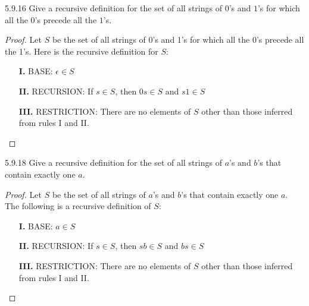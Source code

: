 \begin{question}
    {5.9.16}
    {
        Give a recursive definition for the set of all strings of $0$'s and $1$'s for which all the $0$'s precede all the $1$'s.
    }
\end{question}
\begin{proof}
    Let $S$ be the set of all strings of 0's and 1's for which all the 0's precede all the 1's. Here is the recursive definition for $S$:
    \begin{enumerate}
        \item[\textbf{I.}] BASE: $\epsilon \in S$
        \item[\textbf{II.}] RECURSION: If $s \in S$, then $0s \in S$ and $s1 \in S$
        \item[\textbf{III.}] RESTRICTION: There are no elements of $S$ other than those inferred from rules I and II.
    \end{enumerate}
    \vspace{-\baselineskip}
\end{proof}

\begin{question}
    {5.9.18}
    {
        Give a recursive definition for the set of all strings of $a$'s and $b$'s that contain exactly one $a$.
    }
\end{question}
\begin{proof}
    Let $S$ be the set of all strings of $a$'s and $b$'s that contain exactly one $a$. The following is a recursive definition of $S$:
    \begin{enumerate}
        \item[\textbf{I.}] BASE: $a \in S$
        \item[\textbf{II.}] RECURSION: If $s \in S$, then $sb \in S$ and $bs \in S$
        \item[\textbf{III.}] RESTRICTION: There are no elements of $S$ other than those inferred from rules I and II.
    \end{enumerate}
    \vspace{-\baselineskip}
\end{proof}